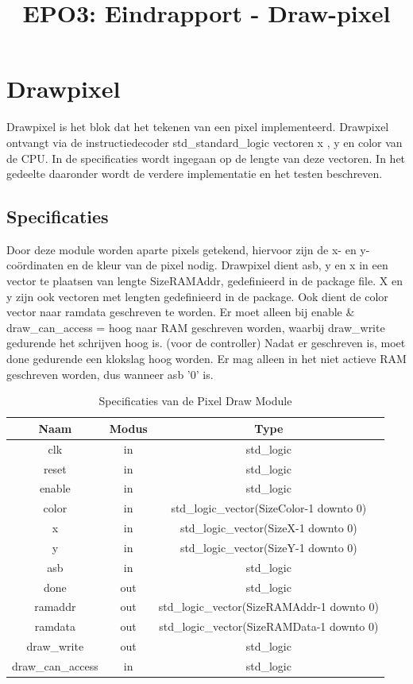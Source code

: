\documentclass{scrartcl} %
\author{}%
\title{EPO3: Eindrapport - Draw-pixel}
\begin{document}
\section{Drawpixel} %
\label{sec:drawpixel} %

Drawpixel is het blok dat het tekenen van een pixel implementeerd. Drawpixel ontvangt via de instructiedecoder std\_standard\_logic vectoren x , y en color van de CPU. In de specificaties wordt ingegaan  op de lengte van deze vectoren. In het gedeelte daaronder wordt de verdere implementatie en het testen beschreven.

\subsection{Specificaties}
\label{ssec:specs_dp}
Door deze module worden aparte pixels getekend, hiervoor zijn de x- en y-coördinaten en de kleur van de pixel nodig. Drawpixel dient asb, y en x in een vector te plaatsen van lengte SizeRAMAddr, gedefinieerd in de package file. X en y zijn ook vectoren met lengten gedefinieerd in de package. Ook dient de color vector naar ramdata geschreven te worden.  Er moet alleen bij enable \& draw\_can\_access = hoog naar RAM geschreven worden, waarbij draw\_write gedurende het schrijven hoog is. (voor de controller)  Nadat er geschreven is, moet done gedurende een klokslag hoog worden. Er mag alleen in het niet actieve RAM geschreven worden, dus wanneer asb '0' is. 

\begin{table}[H]
\centering
\caption{Specificaties van de Pixel Draw Module}
\label{tab:spec-pixel-draw}
\begin{tabular}{c c c}
	\hline\hline
 	Naam & Modus & Type\\
 	\hline	
	clk & in & std\_logic \\
	reset & in & std\_logic \\
	enable& in & std\_logic \\
	color & in & std\_logic\_vector(SizeColor-1 downto 0) \\
	x & in & std\_logic\_vector(SizeX-1 downto 0) \\
	y & in & std\_logic\_vector(SizeY-1 downto 0) \\
	asb & in & std\_logic \\
	done & out & std\_logic \\
	ramaddr &out & std\_logic\_vector(SizeRAMAddr-1 downto 0) \\
	ramdata &out & std\_logic\_vector(SizeRAMData-1 downto 0) \\
	draw\_write &out & std\_logic \\
	draw\_can\_access & in & std\_logic \\
  	\hline
\end{tabular}
\end{table}
\end{document}
